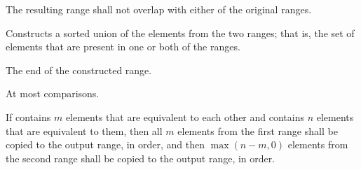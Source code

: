 \begin{itemdescr}
\pnum
\requires
The resulting range shall not overlap with either of the original ranges.

\pnum
\effects
Constructs a sorted union of the elements from the two ranges;
that is, the set of elements that are present in one or both of the ranges.

\pnum
\returns
The end of the constructed range.

\pnum
\complexity
At most
comparisons.

\pnum
\remarks If  contains $m$ elements that are equivalent to
each other and  contains $n$ elements that are equivalent
to them, then all $m$ elements from the first range shall be copied to the output
range, in order, and then $\max(n - m, 0)$ elements from the second range shall
be copied to the output range, in order.
\end{itemdescr}


